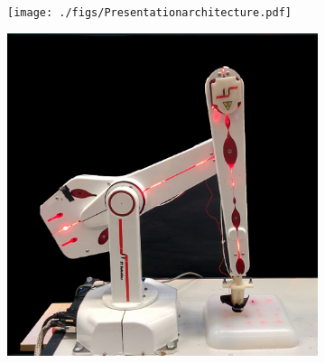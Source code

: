 \documentclass[]{interact}
\theoremstyle{plain}%
\theoremstyle{definition}
\theoremstyle{remark}
\begin{document}
\begin{figure}[]
	\centering
	\begin{subfigure}[b]{.65\textwidth}
		\texttt{[image: ./figs/Presentationarchitecture.pdf]}
		\caption{}
		\label{CySkin:schema}
	\end{subfigure} 
	\hspace{0.01\textwidth}
	\begin{subfigure}[b]{.51\textwidth}
		\includegraphics[width=\textwidth]{./figs/expsetupnew.jpg}
		\caption{}
		\label{exp:robot}
	\end{subfigure} 
	\hspace{0.01\textwidth}
	\begin{subfigure}[b]{0.32\textwidth}

\end{subfigure}
\end{figure}
\end{document}
